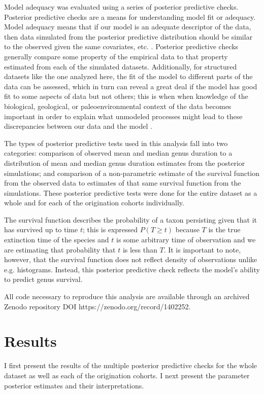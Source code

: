 \documentclass[11pt]{article}
\begin{document}
Model adequacy was evaluated using a series of posterior predictive checks. Posterior predictive checks are a means for understanding model fit or adequacy. Model adequacy means that if our model is an adequate descriptor of the data, then data simulated from the posterior predictive distribution should be similar to the observed given the same covariates, etc. \citep{Gelman2013d}. Posterior predictive checks generally compare some property of the empirical data to that property estimated from each of the simulated datasets. Additionally, for structured datasets like the one analyzed here, the fit of the model to different parts of the data can be assessed, which in turn can reveal a great deal if the model has good fit to some aspects of data but not others; this is when when knowledge of the biological, geological, or paleoenvironmental context of the data becomes important in order to explain what unmodeled processes might lead to these discrepancies between our data and the model \citep{Gelman2013d}.

The types of posterior predictive tests used in this analysis fall into two categories: comparison of observed mean and median genus duration to a distribution of mean and median genus duration estimates from the posterior simulations; and comparison of a non-parametric estimate of the survival function from the observed data to estimates of that same survival function from the simulations. These posterior predictive tests were done for the entire dataset as a whole and for each of the origination cohorts individually.

The survival function describes the probability of a taxon persisting given that it has survived up to time \(t\); this is expressed \(P(T \geq t)\) because \(T\) is the true extinction time of the species and \(t\) is some arbitrary time of observation and we are estimating that probability that \(t\) is less than \(T\). It is important to note, however, that the survival function does not reflect density of observations unlike e.g. histograms. Instead, this posterior predictive check reflects the model's ability to predict genus survival.


All code necessary to reproduce this analysis are available through an archived Zenodo repository DOI https://zenodo.org/record/1402252.






\section*{Results}
I first present the results of the multiple posterior predictive checks for the whole dataset as well as each of the origination cohorts. I next present the parameter posterior estimates and their interpretations. 
\end{document}
